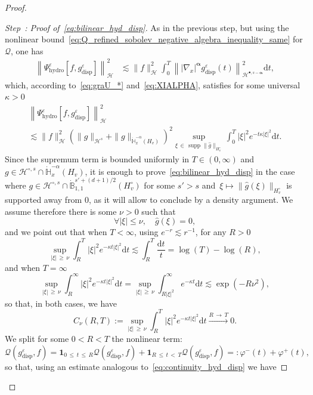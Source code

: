 \documentclass[AHL,Unicode,longabstracts,published]{cedram}
\DeclareMathOperator{\supp}{supp}
\newcommand{\hyd}{\mathrm{hydro}}
\renewcommand{\d}{\mathrm{d}}
\newcommand{\disp}{\mathrm{disp}}
\newcommand{\Burin}{\mathbf{1}}
\newcommand{\bbH}{\mathbb{H}}
\newcommand{\bbB}{\mathbb{B}}
\newcommand{\HH}{\mathcal{H}}
\newcommand{\QQ}{\mathcal{Q}}
\newcommand{\HHH}{\mathscr{H}}
\newcommand{\Ss}{H}
\newcommand{\Ssm}{H^{\circ}}
\newcommand{\rSSs}[1]{\HH^{#1}}
\newcommand{\rSSsp}[1]{\HH^{{\bullet}, #1}}
\newcommand{\rSSsm}[1]{\HH^{{\circ}, #1}}
\newcommand{\SSSs}{\HHH}
\renewcommand*\le{\leqslant}
\renewcommand*\ge{\geqslant}
\newcommand*\eps{{\varepsilon}}
\newcounter{stepcount}
\newenvironment{step}[1]{\refstepcounter{stepcount}\begin{proof}[Step~\thestepcount: #1]}{\let\qed\relax\end{proof}}
\let\oldforall\forall
\renewcommand*{\forall}{\mathrel{\oldforall}}
\begin{document}
\begin{proof}
\begin{step}{{Proof of~\eqref{eq:bilinear_hyd_disp}}}\label{prfprop5.4step2}
As in the previous step, but using the nonlinear bound~\eqref{eq:Q_refined_sobolev_negative_algebra_inequality_same} for $\QQ$, one has
\begin{align*}
\left\| \Psi^\eps_\hyd\left[f, g^\eps_\disp\right] \right\|^2_\SSSs & \lesssim \| f \|_{ \SSSs}^2 \int_0^T \left\| | \nabla_{x} |^{\boldsymbol{\alpha}} g^\eps_\disp(t) \right\|^2_{ \rSSsp{s-{\boldsymbol{\alpha}}} } \d t,
\end{align*}
which, according to~\eqref{eq:graU_*} and~\eqref{eq:XIALPHA}, satisfies for some universal $\kappa > 0$
\begin{multline}\label{eq:continuity_hyd_disp}
\left\| \Psi^\eps_\hyd\left[f, g^\eps_\disp\right] \right\|^2_\SSSs \\
\lesssim \| f \|_{ \SSSs}^2 \left(\| g \|_{ \rSSs{s} } + \| g \|_{ \dot{\bbH}^{-\alpha}_x \left(\Ss_v \right) } \right)^2 \sup_{\xi\,\in\,\supp \| \widehat{g} \|_{\Ssm_v} } \int_0^T | \xi |^2 e^{-t \kappa | \xi |^2 } \d t.
\end{multline}
Since the supremum term is bounded uniformly in $T \in (0, \infty)$ and $g \in \rSSsm{s} \cap \dot{\bbH}^{-\alpha}_x (\Ss_v)$, it is enough to prove~\eqref{eq:bilinear_hyd_disp} in the case where $g \in \rSSsm{s} \cap \dot{\bbB}^{s' + (d+1)/2 }_{1, 1} (\Ssm_v)$ for some $s' > s$ and~$\xi \mapsto \| \widehat{g}(\xi) \|_{ \Ssm_v }$ is supported away from $0$, as it will allow to conclude by a density argument. We assume therefore there is some $\nu > 0$ such that
\[
\forall | \xi | \le \nu, \quad \widehat{g}(\xi) = 0,
\]
and we point out that when $T < \infty$, using $e^{-r} \lesssim r^{-1}$, for any $R > 0$
\[
\sup_{|\xi |\,\ge\,\nu} \int_R^T | \xi|^2 e^{-\kappa t | \xi |^2} \d t \lesssim \int_{ R }^{ T } \frac{\d t}{t} = \log(T) - \log(R),
\]
and when $T = \infty$
\[
\sup_{|\xi |\,\ge\,\nu} \int_R^\infty | \xi|^2 e^{-\kappa t | \xi |^2} \d t = \sup_{|\xi |\,\ge\,\nu } \int_{ R | \xi |^2 }^\infty e^{- \kappa t } \d t \lesssim \exp\left(- R \nu^2 \right),
\]
so that, in both cases, we have
\[
C_\nu(R, T) := \sup_{|\xi |\,\ge\,\nu} \int_R^T | \xi|^2 e^{-\kappa t | \xi |^2} \d t \xrightarrow[]{R\,\to\,T} 0.
\]
We split for some $0 < R < T$ the nonlinear term:
\[
\QQ\left(g^\eps_\disp, f\right) = \Burin_{0\,\le\,t\,\le\,R} \QQ\left(g^\eps_\disp, f\right) + \Burin_{R\,\le\,t\,<\,T} \QQ\left(g^\eps_\disp, f\right) =: \varphi^-(t) + \varphi^+(t),
\]
so that, using an estimate analogous to~\eqref{eq:continuity_hyd_disp} we have

\end{step}
\end{proof}
\end{document}
